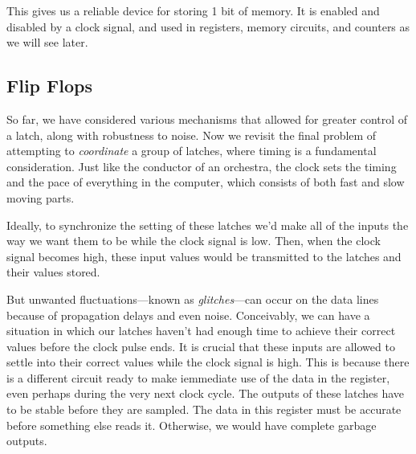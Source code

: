 \begin{definition}
\begin{figure}[H]
      \caption{} 
    \end{figure}
  \end{definition}

  This gives us a reliable device for storing 1 bit of memory. It is enabled and disabled by a clock signal, and used in registers, memory circuits, and counters as we will see later. 

\subsection{Flip Flops}

  So far, we have considered various mechanisms that allowed for greater control of a latch, along with robustness to noise. Now we revisit the final problem of attempting to \textit{coordinate} a group of latches, where timing is a fundamental consideration. Just like the conductor of an orchestra, the clock sets the timing and the pace of everything in the computer, which consists of both fast and slow moving parts. 

  \begin{figure}[H]
    \centering 
    \caption{}
  \end{figure}

  Ideally, to synchronize the setting of these latches we'd make all of the inputs the way we want them to be while the clock signal is low. Then, when the clock signal becomes high, these input values would be transmitted to the latches and their values stored. 

  But unwanted fluctuations---known as \textit{glitches}---can occur on the data lines because of propagation delays and even noise.  Conceivably, we can have a situation in which our latches haven't had enough time to achieve their correct values before the clock pulse ends. It is crucial that these inputs are allowed to settle into their correct values while the clock signal is high. This is because there is a different circuit ready to make iemmediate use of the data in the register, even perhaps during the very next clock cycle. The outputs of these latches have to be stable before they are sampled. The data in this register must be accurate before something else reads it. Otherwise, we would have complete garbage outputs. 

